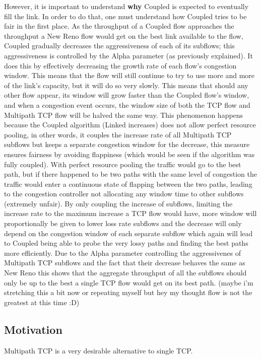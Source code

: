 However, it is important to understand \textbf{why} Coupled is expected to
eventually fill the link. In order to do that, one must understand how Coupled
tries to be fair in the first place. As the throughput of a Coupled flow
approaches the throughput a New Reno flow would get on the best link available
to the flow, Coupled gradually decreases the aggressiveness of each of its
subflows; this aggressiveness is controlled by the Alpha parameter (as
previously explained). It does this by effectively decreasing the growth rate of
each flow's congestion window. This means that the flow will still continue to
try to use more and more of the link's capacity, but it will do so very slowly.
This means that should any other flow appear, its window will grow faster than
the Coupled flow's window, and when a congestion event occurs, the window size
of both the TCP flow and Multipath TCP flow will be halved the same way. This
phenomenon happens because the Coupled algorithm (Linked increases) does not
allow perfect resource pooling, in other words, it couples the increase rate of
all Multipath TCP subflows but keeps a separate congestion window for the
decrease, this measure ensures fairness by avoiding flappiness (which would be
seen if the algorithm was fully coupled). With perfect resource pooling the
traffic would go to the best path, but if there happened to be two paths with
the same level of congestion the traffic would enter a continuous state of
flapping between the two paths, leading to the congestion controller not
allocating any window time to other subflows (extremely unfair). By only
coupling the increase of subflows, limiting the increase rate to the maximum
increase a TCP flow would have, more window will proportionally be given to
lower loss rate subflows and the decrease will only depend on the congestion
window of each separate subflow which again will lead to Coupled being able to
probe the very lossy paths and finding the best paths more efficiently.  Due to
the Alpha parameter controlling the aggressivenes of Multipath TCP subflows and
the fact that their decrease behaves the same as New Reno this shows that the
aggregate throughput of all the subflows should only be up to the best a single
TCP flow would get on its best path. (maybe i'm stretching this a bit now or
repeating myself but hey my thought flow is not the greatest at this
time :D)  %

\subsection{Motivation}
Multipath TCP is a very desirable alternative to single TCP.

